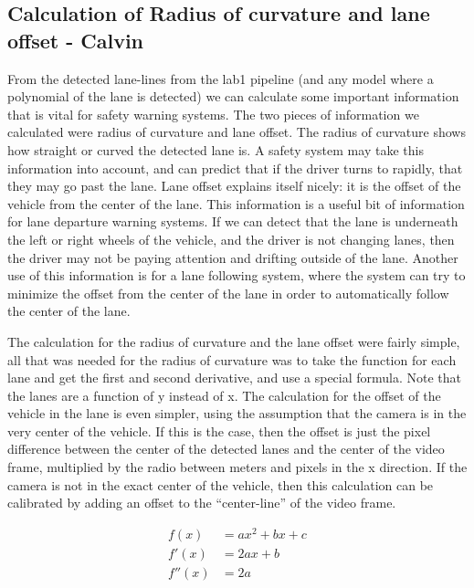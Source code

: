 \documentclass[twoside,twocolumn]{article}
\begin{document}
\subsection{Calculation of Radius of curvature and lane offset - Calvin}
\par From the detected lane-lines from the lab1 pipeline (and any model where a polynomial of the lane is detected) we can calculate some important information that is vital for safety warning systems. The two pieces of information we calculated were radius of curvature and lane offset. The radius of curvature shows how straight or curved the detected lane is. A safety system may take this information into account, and can predict that if the driver turns to rapidly, that they may go past the lane. Lane offset explains itself nicely: it is the offset of the vehicle from the center of the lane. This information is a useful bit of information for lane departure warning systems. If we can detect that the lane is underneath the left or right wheels of the vehicle, and the driver is not changing lanes, then the driver may not be paying attention and drifting outside of the lane. Another use of this information is for a lane following system, where the system can try to minimize the offset from the center of the lane in order to automatically follow the center of the lane.
\par The calculation for the radius of curvature and the lane offset were fairly simple, all that was needed for the radius of curvature was to take the function for each lane and get the first and second derivative, and use a special formula. Note that the lanes are a function of y instead of x. The calculation for the offset of the vehicle in the lane is even simpler, using the assumption that the camera is in the very center of the vehicle. If this is the case, then the offset is just the pixel difference between the center of the detected lanes and the center of the video frame, multiplied by the radio between meters and pixels in the x direction. If the camera is not in the exact center of the vehicle, then this calculation can be calibrated by adding an offset to the “center-line” of the video frame.

\begin{subequations}
\begin{align} \label{eq:derivates}
f(x) &= ax^2 + bx + c \\
f'(x) &= 2ax + b \\
f''(x) &= 2a
\end{align}
\end{subequations}
\end{document}
